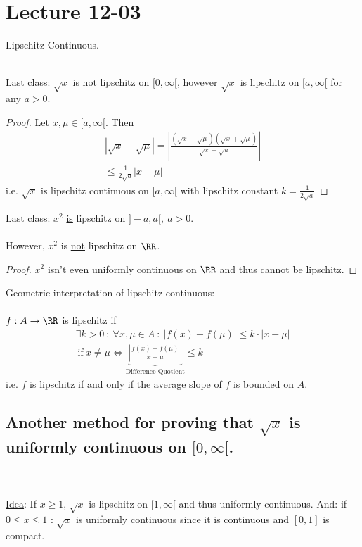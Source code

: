 \documentclass[class=scrartcl, crop=false]{standalone}
\date{2019-12-03}
\begin{document}
\section{Lecture 12-03}

Lipschitz Continuous.
\\\\
\begin{example}
  Last class: $\sqrt{x}$ is \ul{not} lipschitz on $[0, \infty[$, however $\sqrt{x}$ \ul{is} lipschitz on $[a, \infty[$ for any $a > 0$.
  \begin{proof}
    Let $x, \mu \in [a, \infty[$. Then 
    \begin{gather*}
      |\sqrt{x} - \sqrt{\mu}| = |\frac{(\sqrt{x} - \sqrt{\mu})(\sqrt{x} + \sqrt{\mu})}{\sqrt{x} + \sqrt{u}}|
      \\
      \leq 
      \frac{1}{2\sqrt{a}}|x - \mu|
    \end{gather*} 
    i.e. $\sqrt{x}$ is lipschitz continuous on $[a, \infty[$ with lipschitz constant $k = \frac{1}{2\sqrt{a}}$
  \end{proof} 
\end{example} 

\begin{example}
  Last class: $x^2$ \ul{is} lipschitz on $]-a, a[, \ a > 0$.
  \\\\However, $x^2$ is \ul{not} lipschitz on $\RR$.
  \begin{proof}
    $x^2$ isn't even uniformly continuous on $\RR$ and thus cannot be lipschitz.
  \end{proof} 
\end{example} 

\begin{definition}
  Geometric interpretation of lipschitz continuous:
  \\\\
  $f: A \to \RR$ is lipschitz if  
  \begin{gather*}
    \exists k > 0 \ : \ \forall x, \mu \in A \ : \ |f(x) - f(\mu)| \leq k \cdot |x - \mu|
    \\
    \ \text{if} \ x \neq \mu \Leftrightarrow \underbrace{|\frac{f(x) - f(\mu)}{x - \mu}|}_{\text{Difference Quotient}} \leq k
  \end{gather*} 
  i.e. $f$ is lipschitz if and only if the average slope of $f$ is bounded on $A$.
\end{definition} 

\subsection{Another method for proving that $\sqrt{x}$ is uniformly continuous on $[0, \infty[$.} \leavevmode
\\\\
\ul{Idea}: If $x \geq 1$, $\sqrt{x}$ is lipschitz on $[1, \infty[$ and thus uniformly continuous. And: if $0 \leq x \leq 1$ : $\sqrt{x}$ is uniformly continuous since it is continuous and $[0, 1]$ is compact.
\end{document}
